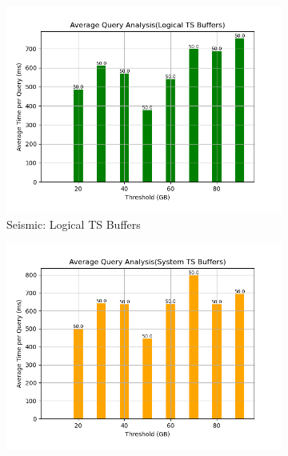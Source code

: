 \begin{figure}
	\centering
	\begin{subfigure}[c]{0.48\textwidth}
		\includegraphics[width=1\textwidth]   {figures/Experiments/Dynamic/SEISMIC/batch_answering/50/average_query_time_per_batch_version_999777015_10485760_10_delay[50].png}
		\caption{Seismic: Logical TS Buffers}
		\label{fig:logical-ts-50-seismic}
	\end{subfigure}
	\begin{subfigure}[c]{0.48\textwidth}
		\includegraphics[width=1\textwidth]	 {figures/Experiments/Dynamic/SEISMIC/batch_answering/50/average_query_time_per_batch_version_999777018_10485760_10_delay[50].png}

\end{subfigure}
\end{figure}
